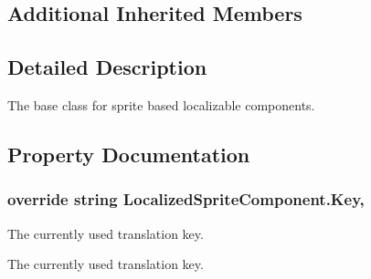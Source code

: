 \subsection*{Additional Inherited Members}


\subsection{Detailed Description}
The base class for sprite based localizable components. 



\subsection{Property Documentation}
\subsubsection[{\texorpdfstring{Key}{Key}}]{\setlength{\rightskip}{0pt plus 5cm}override string Localized\+Sprite\+Component.\+Key\hspace{0.3cm}{\ttfamily [get]}, {\ttfamily [set]}}\hypertarget{class_localized_sprite_component_aec3112583fae350f76cc368490358bcf}{}\label{class_localized_sprite_component_aec3112583fae350f76cc368490358bcf}


The currently used translation key. 

The currently used translation key.